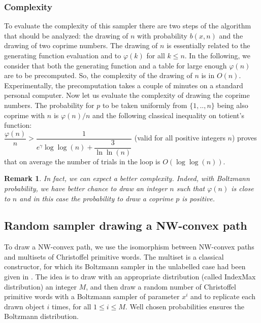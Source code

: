 \documentclass{article}
\newtheorem{remark}[theorem]{Remark}
\begin{document}
\subsubsection{Complexity}
To evaluate the complexity of this sampler there are two steps
of the algorithm that should be analyzed: the drawing of $n$
with probability $b(x,n)$ and the drawing of two coprime numbers.
The drawing of $n$ is essentially related to the generating
function evaluation and to $\varphi(k)$ for all $k\leq n$. In
the following, we consider that both the generating function and a
table for large enough $\varphi(n)$ are to be precomputed. So,
the complexity of the drawing of $n$ is in $O(n)$. Experimentally,
the precomputation takes a couple of minutes on a standard
personal computer. Now let us evaluate the complexity of drawing
the coprime numbers. The probability for $p$ to be taken
uniformly from $\{1,..,n\}$ being also coprime with $n$ is
$\varphi(n)/n$
and the following classical inequality \cite[Thm 8.8.7]{BachShallit} on totient's function:\\
 $\dfrac{\varphi(n)}{n}>\dfrac1{e^\gamma\log \log
(n)+\dfrac{3}{\ln \ln (n)}}$ (valid for all positive integers
$n$) proves
that on average the number of trials in the loop is $O(\log \log (n))$.\\
\begin{remark}
In fact, we can expect a better complexity. Indeed, with Boltzmann probability, we have better chance to draw an integer $n$ such that $\varphi(n)$ is close to $n$ and in this case the probability to draw a coprime $p$ is positive.
\end{remark}






\subsection{Random sampler drawing a NW-convex path}

To draw a NW-convex path, we use the isomorphism between NW-convex paths and multisets of Christoffel primitive words. 
The multiset is a classical constructor, for which its Boltzmann sampler in the unlabelled case had been given in \cite{FlaFuPi07}.
The idea is to draw with an appropriate distribution (called IndexMax distribution) an integer $M$, 
and then draw a random number of Christoffel primitive words with a Boltzmann sampler of parameter $x^i$ and to 
replicate each drawn object $i$ times, for all $1\leq i\leq M$. Well chosen probabilities ensures the Boltzmann distribution.
\end{document}
